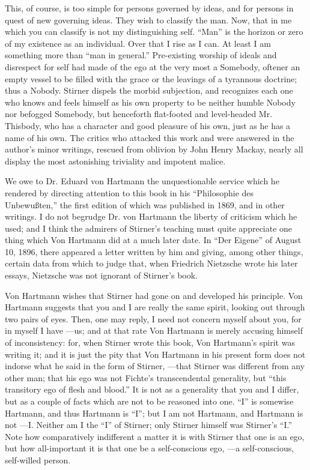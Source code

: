 This, of course, is too simple for persons governed by ideas, and for persons 
in quest of new governing ideas. They wish to classify the man. Now, that in 
me which you can classify is not my distinguishing self. ``Man'' is the 
horizon or zero of my existence as an individual. Over that I rise as I can. 
At least I am something more than ``man in general.'' Pre-existing worship 
of ideals and disrespect for self had made of the ego at the very most a 
Somebody, oftener an empty vessel to be filled with the grace or the leavings 
of a tyrannous doctrine; thus a Nobody. Stirner dispels the morbid subjection, 
and recognizes each one who knows and feels himself as his own property to be 
neither humble Nobody nor befogged Somebody, but henceforth flat-footed and 
level-headed Mr. Thisbody, who has a character and good pleasure of his own, 
just as he has a name of his own. The critics who attacked this work and were 
answered in the author's minor writings, rescued from oblivion by John Henry 
Mackay, nearly all display the most astonishing triviality and impotent 
malice.

We owe to Dr. Eduard von Hartmann the unquestionable service which he rendered 
by directing attention to this book in his ``Philosophie des 
Unbewu\ss{}ten,'' the first edition of which was published in 1869, and in 
other writings. I do not begrudge Dr. von Hartmann the liberty of criticism 
which he used; and I think the admirers of Stirner's teaching must quite 
appreciate one thing which Von Hartmann did at a much later date. In ``Der 
Eigene'' of August 10, 1896, there appeared a letter written by him and 
giving, among other things, certain data from which to judge that, when 
Friedrich Nietzsche wrote his later essays, Nietzsche was not ignorant of 
Stirner's book.

Von Hartmann wishes that Stirner had gone on and developed his principle. Von 
Hartmann suggests that you and I are really the same spirit, looking out 
through two pairs of eyes. Then, one may reply, I need not concern myself 
about you, for in myself I have ---us; and at that rate Von Hartmann is merely 
accusing himself of inconsistency: for, when Stirner wrote this book, Von 
Hartmann's spirit was writing it; and it is just the pity that Von Hartmann in 
his present form does not indorse what he said in the form of Stirner, ---that 
Stirner was different from any other man; that his ego was not Fichte's 
transcendental generality, but ``this transitory ego of flesh and blood.'' 
It is not as a generality that you and I differ, but as a couple of facts 
which are not to be reasoned into one. ``I'' is somewise Hartmann, and thus 
Hartmann is ``I''; but I am not Hartmann, and Hartmann is not ---I. Neither 
am I the ``I'' of Stirner; only Stirner himself was Stirner's ``I.'' Note 
how comparatively indifferent a matter it is with Stirner that one is an ego, 
but how all-important it is that one be a self-conscious ego, ---a 
self-conscious, self-willed person.


